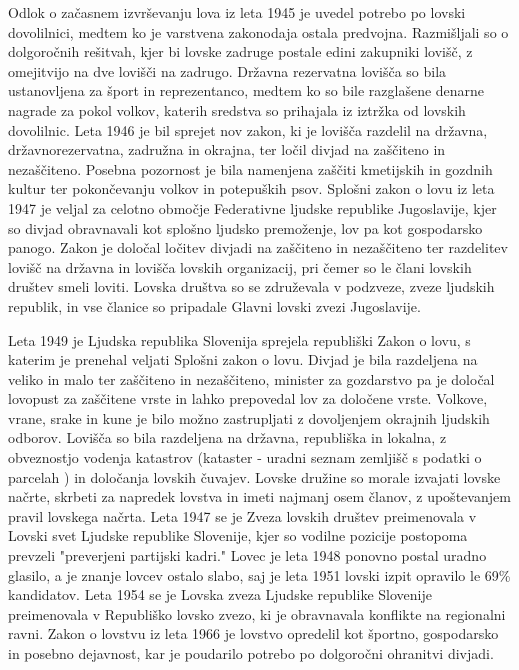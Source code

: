 \documentclass[a4paper,12pt,openright]{book}
\begin{document}
Odlok o začasnem izvrševanju lova iz leta 1945 je uvedel potrebo po lovski dovolilnici, medtem ko je varstvena zakonodaja ostala predvojna.
Razmišljali so o dolgoročnih rešitvah, kjer bi lovske zadruge postale edini zakupniki lovišč, z omejitvijo na dve lovišči na zadrugo. 
Državna rezervatna lovišča so bila ustanovljena za šport in reprezentanco, medtem ko so bile razglašene denarne nagrade za pokol volkov, katerih sredstva so prihajala iz iztržka od lovskih dovolilnic. 
Leta 1946 je bil sprejet nov zakon, ki je lovišča razdelil na državna, državnorezervatna, zadružna in okrajna, ter ločil divjad na zaščiteno in nezaščiteno. 
Posebna pozornost je bila namenjena zaščiti kmetijskih in gozdnih kultur ter pokončevanju volkov in potepuških psov.\cite{Lov_202_218}
Splošni zakon o lovu iz leta 1947 je veljal za celotno območje Federativne ljudske republike Jugoslavije, kjer so divjad obravnavali kot splošno ljudsko premoženje, lov pa kot gospodarsko panogo. 
Zakon je določal ločitev divjadi na zaščiteno in nezaščiteno ter razdelitev lovišč na državna in lovišča lovskih organizacij, pri čemer so le člani lovskih društev smeli loviti.
Lovska društva so se združevala v podzveze, zveze ljudskih republik, in vse članice so pripadale Glavni lovski zvezi Jugoslavije.\cite{Lov_235_244}

Leta 1949 je Ljudska republika Slovenija sprejela republiški Zakon o lovu, s katerim je prenehal veljati Splošni zakon o lovu. 
Divjad je bila razdeljena na veliko in malo ter zaščiteno in nezaščiteno, minister za gozdarstvo pa je določal lovopust za zaščitene vrste in lahko prepovedal lov za določene vrste.
Volkove, vrane, srake in kune je bilo možno zastrupljati z dovoljenjem okrajnih ljudskih odborov.
Lovišča so bila razdeljena na državna, republiška in lokalna, z obveznostjo vodenja katastrov (kataster - uradni seznam zemljišč s podatki o parcelah \cite{fran}) in določanja lovskih čuvajev. 
Lovske družine so morale izvajati lovske načrte, skrbeti za napredek lovstva in imeti najmanj osem članov, z upoštevanjem pravil lovskega načrta.\cite{Lov_258_276}
Leta 1947 se je Zveza lovskih društev preimenovala v Lovski svet Ljudske republike Slovenije, kjer so vodilne pozicije postopoma prevzeli "preverjeni partijski kadri."
Lovec je leta 1948 ponovno postal uradno glasilo, a je znanje lovcev ostalo slabo, saj je leta 1951 lovski izpit opravilo le 69\% kandidatov.
Leta 1954 se je Lovska zveza Ljudske republike Slovenije preimenovala v Republiško lovsko zvezo, ki je obravnavala konflikte na regionalni ravni. 
Zakon o lovstvu iz leta 1966 je lovstvo opredelil kot športno, gospodarsko in posebno dejavnost, kar je poudarilo potrebo po dolgoročni ohranitvi divjadi.\cite{Sto_63_77}
\end{document}
